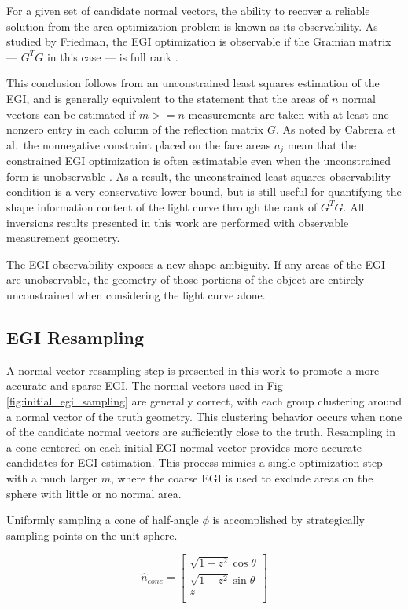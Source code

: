 For a given set of candidate normal vectors, the ability to recover a reliable solution from the area optimization problem is known as its observability. As studied by Friedman, the EGI optimization is observable if the Gramian matrix --- $G^T G$ in this case --- is full rank \cite{friedman2020}.

This conclusion follows from an unconstrained least squares estimation of the EGI, and is generally equivalent to the statement that the areas of $n$ normal vectors can be estimated if $m>=n$ measurements are taken with at least one nonzero entry in each column of the reflection matrix $G$. As noted by Cabrera et al.\, the nonnegative constraint placed on the face areas $a_j$ mean that the constrained EGI optimization is often estimatable even when the unconstrained form is unobservable \cite{cabrera2021}. As a result, the unconstrained least squares observability condition is a very conservative lower bound, but is still useful for quantifying the shape information content of the light curve through the rank of $G^T G$. All inversions results presented in this work are performed with observable measurement geometry. 

The EGI observability exposes a new shape ambiguity. If any areas of the EGI are unobservable, the geometry of those portions of the object are entirely unconstrained when considering the light curve alone.

\subsection{EGI Resampling}

A normal vector resampling step is presented in this work to promote a more accurate and sparse EGI. The normal vectors used in Fig \ref{fig:initial_egi_sampling} are generally correct, with each group clustering around a normal vector of the truth geometry. This clustering behavior occurs when none of the candidate normal vectors are sufficiently close to the truth. Resampling in a cone centered on each initial EGI normal vector provides more accurate candidates for EGI estimation. This process mimics a single optimization step with a much larger $m$, where the coarse EGI is used to exclude areas on the sphere with little or no normal area.

Uniformly sampling a cone of half-angle $\phi$ is accomplished by strategically sampling points on the unit sphere. 

\begin{equation} \label{eq:cone_sample_n_pole}
  \hat{n}_{cone} = \begin{bmatrix}
    \sqrt{1-z^2}\cos{\theta} \\
    \sqrt{1-z^2}\sin{\theta} \\
    z \\
  \end{bmatrix}
\end{equation}

